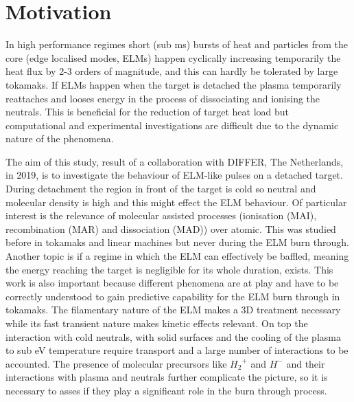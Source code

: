 

\section{Motivation}\label{Motivation magnum-psi}


In high performance regimes short (sub ms) bursts of heat and particles from the core (edge localised modes, ELMs) happen cyclically increasing temporarily the heat flux by 2-3 orders of magnitude, and this can hardly be tolerated by large tokamaks. \cite{Jachmich2011} If ELMs happen when the target is detached the plasma temporarily reattaches and looses energy in the process of dissociating and ionising the neutrals. This is beneficial for the reduction of target heat load but computational and experimental investigations are difficult due to the dynamic nature of the phenomena.

The aim of this study, result of a collaboration with DIFFER, The Netherlands, in 2019, is to investigate the behaviour of ELM-like pulses on a detached target. During detachment the region in front of the target is cold so neutral and molecular density is high and this might effect the ELM behaviour. Of particular interest is the relevance of molecular assisted processes (ionisation (MAI), recombination (MAR) and dissociation (MAD)) over atomic. This was studied before in tokamaks and linear machines but never during the ELM burn through. \cite{Akkermans2020,Verhaegh2021a} Another topic is if a regime in which the ELM can effectively be baffled, meaning the energy reaching the target is negligible for its whole duration, exists. This work is also important because different phenomena are at play and have to be correctly understood to gain predictive capability for the ELM burn through in tokamaks. The filamentary nature of the ELM makes a 3D treatment necessary\cite{Smith2020,Smith2020a} while its fast transient nature makes kinetic effects relevant.\cite{Mijin2020} On top the interaction with cold neutrals, with solid surfaces and the cooling of the plasma to sub eV temperature require transport and a large number of interactions to be accounted.\cite{Zhou2022,Tskhakaya2009} The presence of molecular precursors like ${H_2}^+$ and $H^-$ and their interactions with plasma and neutrals further complicate the picture, so it is necessary to asses if they play a significant role in the burn through process.

